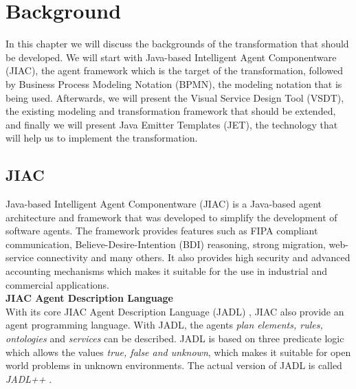 \chapter{Background}
\label{chap:background}
In this chapter we will discuss the backgrounds of the transformation that should be developed. We will start with Java-based Intelligent Agent Componentware (JIAC), the agent framework which is the target of the transformation, followed by Business Process Modeling Notation (BPMN), the modeling notation that is being used. Afterwards, we will present the Visual Service Design Tool (VSDT), the existing modeling and transformation framework that should be extended, and finally we will present Java Emitter Templates (JET), the technology that will help us to implement the transformation.

\section{JIAC}
Java-based Intelligent Agent Componentware (JIAC) is a Java-based agent architecture and framework that was developed to simplify the development of software agents\cite{JIACWEB}. The framework provides features such as FIPA compliant communication, Believe-Desire-Intention (BDI) reasoning, strong migration, web-service
connectivity and many others. It also provides high security and advanced accounting mechanisms which makes it suitable for the use in industrial and commercial applications.\\

\textbf{JIAC Agent Description Language}\\
With its core JIAC Agent Description Language (JADL) \cite{jadl_basic}, JIAC also provide an agent programming language. With JADL, the agents \textit{plan elements, rules, ontologies} and \textit{services} can be described. JADL is based on three predicate logic which allows the values \textit{true, false and unknown}, which makes it suitable for open world problems in unknown environments. The actual version of JADL is called \textit{JADL++} \cite{BHTKAH09}.\\

